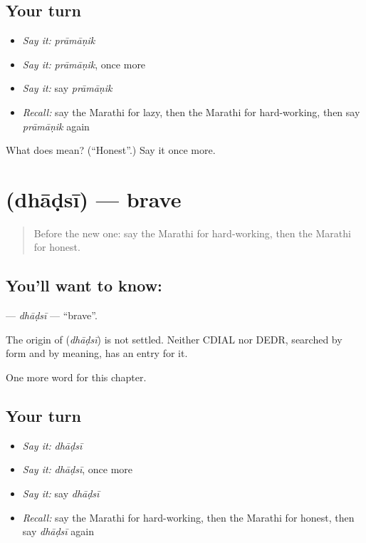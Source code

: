\subsection*{Your turn}
\begin{itemize}
\raggedright
  \item \emph{Say it:} \emph{prāmāṇik}
  \item \emph{Say it:} \emph{prāmāṇik}, once more
  \item \emph{Say it:} say \emph{prāmāṇik}
  \item \emph{Recall:} say the Marathi for lazy, then the Marathi for hard-working, then say \emph{prāmāṇik} again
\end{itemize}

\begin{tcolorbox}[breakable,colback=teal!4,colframe=teal!35!black,title={Before you move on}]
What does  mean? (\textquotedblleft{}Honest\textquotedblright{}.) Say it once more.
\end{tcolorbox}
\section[\texorpdfstring{\mr{धाडसी} (dhāḍsī)}{धाडसी (dhāḍsī)}]{ (dhāḍsī) — brave}

\label{lesson:MR-C151-dhadsi}



\begin{quote}
Before the new one: say the Marathi for hard-working, then the Marathi for honest.
\end{quote}

\subsection*{You'll want to know: }
\textbf{} — \emph{dhāḍsī} — \textquotedblleft{}brave\textquotedblright{}.

\begin{cousinweb}
The origin of \textbf{} (\emph{dhāḍsī}) is not settled. Neither CDIAL nor DEDR, searched by form and by meaning, has an entry for it.
\end{cousinweb}

\begin{grammarlens}[title={What you've built}]
One more word for this chapter.
\end{grammarlens}

\subsection*{Your turn}
\begin{itemize}
\raggedright
  \item \emph{Say it:} \emph{dhāḍsī}
  \item \emph{Say it:} \emph{dhāḍsī}, once more
  \item \emph{Say it:} say \emph{dhāḍsī}
  \item \emph{Recall:} say the Marathi for hard-working, then the Marathi for honest, then say \emph{dhāḍsī} again
\end{itemize}

